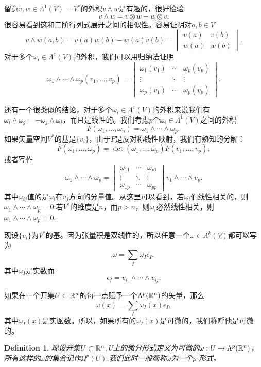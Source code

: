 \documentclass[8pt]{book}
\theoremstyle{plain}%
\newtheorem{defi}{Definition}[section]%
\begin{document}
留意$v,w\in \Lambda^1(V)=V^*$的外积$v\wedge w$是有趣的，很好检验
\[
	v\wedge w=v\otimes w- w\otimes v.
\]
很容易看到这和二阶行列式展开之间的相似性。容易证明对$a,b\in V$
\[
	v\wedge w(a,b)=v(a)w(b)- w(a)v(b)=\begin{vmatrix}v(a)&v(b)\\w(a)&w(b)\end{vmatrix}.
\]
对于多个$\omega_i \in \Lambda^1(V)$的外积，我们可以用归纳法证明
\[
	\omega_1\wedge \cdots \wedge\omega_p(v_1,\dots,v_p)=
	\begin{vmatrix}
		\omega_1(v_1)&\cdots&\omega_p(v_p)\\
		\vdots&\ddots&\vdots\\
		\omega_p(v_1)&\cdots&\omega_p(v_p)
	\end{vmatrix}.
\]

还有一个很类似的结论，对于多个$\omega_i \in \Lambda^1(V)$的外积来说我们有$\omega_i \wedge \omega_j=-\omega_j \wedge \omega_i$，而且是线性的。我们考虑$p$个$\omega_i \in \Lambda^1(V)$之间的外积
\[
	F(\omega_1, \dots,\omega_n)=\omega_1\wedge \cdots \wedge \omega_p,
\]
如果矢量空间$V^*$的基是$\{v_i\}$，由于$F$是反对称线性映射，我们有熟知的分解：
\[
	F(\omega_1, \dots,\omega_p)=\det(\omega_1, \dots,\omega_p)F(v_1, \dots,v_p),
\]
或者写作
\[
	\omega_1\wedge \cdots \wedge \omega_p=
	\begin{vmatrix}
		\omega_{11}&\cdots&\omega_{p1}\\
		\vdots&\ddots&\vdots\\
		\omega_{1p}&\cdots&\omega_{pp}
	\end{vmatrix}
	v_1\wedge \cdots \wedge v_p.
\]
其中$\omega_{ij}$值的是$\omega_i$在$v_j$方向的分量值。从这里可以看到，若$\omega_i$们线性相关的，则$\omega_1\wedge \cdots \wedge \omega_p=0$.若$V^*$的维度是$n$，而$p>n$，则$\omega_i$必然线性相关，则$\omega_1\wedge \cdots \wedge \omega_p=0$.

现设$\{v_i\}$为$V^*$的基。因为张量积是双线性的，所以任意一个$\omega \in \Lambda^k(V)$都可以写为
\[
\omega=\sum_I\omega_I \epsilon_I,
\]
其中$\omega_I $是实数而
\[
\epsilon_I=v_{i_1}\wedge \cdots \wedge v_{i_k}.
\]

如果在一个开集$U\subset \mathbb{R}^n$的每一点赋予一个$\Lambda^p(\mathbb{R}^n)$的矢量，那么
\[
\omega(x)=\sum_I\omega_I(x) \epsilon_I,
\]
其中$\omega_I(x)$是实函数。所以，如果所有的$\omega_I(x)$是可微的，我们称呼他是可微的。
\begin{defi}
现设开集$U\subset \mathbb{R}^n$,U上的微分形式定义为可微的$\omega:U \to \Lambda^p(\mathbb{R}^n)$，所有这样的$\omega$的集合记作$\Omega^p(U)$.我们此时一般简称$\omega$为一个$p$-形式。
\end{defi}
\end{document}
